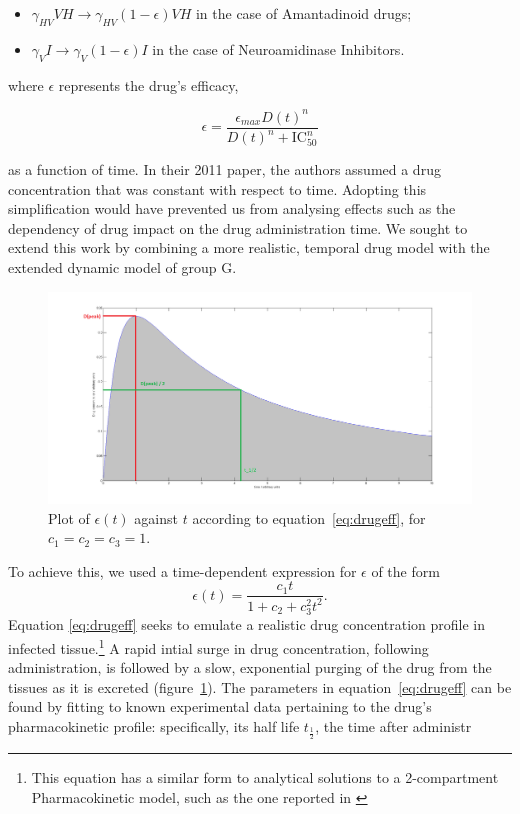 \documentclass[a4paper, 12pt]{report}
\begin{document}
\begin{itemize}
\item  $\gamma_{HV}VH \rightarrow \gamma_{HV}(1 - \epsilon)VH$ in the case of Amantadinoid drugs;
\item $\gamma_{V}I \rightarrow \gamma_{V}(1 - \epsilon)I $ in the case of Neuroamidinase Inhibitors.
\end{itemize}

where $\epsilon$ represents the drug's efficacy,

\begin{equation}
\epsilon = \frac{\epsilon_{max}D(t)^{n}}{D(t)^{n}+\mathrm{IC}^{n}_{50}}
\end{equation}

as a function of time.
In their 2011 paper, the authors assumed a drug concentration that was constant with respect to time. Adopting this simplification would have prevented us from analysing effects such as the dependency of drug impact on the drug administration time.
We sought to extend this work by combining a more realistic, temporal drug model with the extended dynamic model of group G.\cite{Group G}

\begin{figure}[htb]
\begin{centering}
\includegraphics[width=150mm]{DrugProfile.png}
\caption{Plot of $\epsilon(t)$ against $t$ according to equation~\eqref{eq:drugeff}, for $c_1 = c_2 = c_3 = 1$.}
\label{fig:DrugProfile}
\end{centering}
\end{figure}

To achieve this, we used a time-dependent expression for $\epsilon$ of the form
\begin{equation}
\epsilon(t) = \frac{c_{1}t}{1 + c_{2}+c_{3}^{2}t^{2}}. \label{eq:drugeff}
\end{equation}
Equation \eqref{eq:drugeff} seeks to emulate a realistic drug concentration profile in infected tissue.\footnote{This equation has a similar form to analytical solutions to a 2-compartment Pharmacokinetic model, such as the one reported in \cite{}}
A rapid intial surge in drug concentration, following administration, is followed by a slow, exponential purging of the drug from the tissues as it is excreted (figure~\ref{fig:DrugProfile}). The parameters in equation~\ref{eq:drugeff} can be found by fitting to known experimental data pertaining to the drug's pharmacokinetic profile: specifically, its half life $t_{\frac{1}{2}}$, the time after administr
\end{document}
